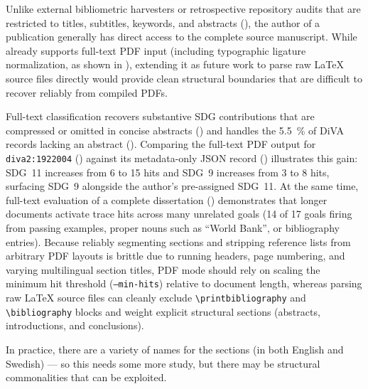 \begin{recommendation}
\label{rec:fullTextAuthorSource}
Unlike external bibliometric harvesters or retrospective repository audits that are restricted to titles, subtitles, keywords, and abstracts (), the author of a publication generally has direct access to the complete source manuscript. While  already supports full-text \gls{PDF} input (including typographic ligature normalization, as shown in ), extending it as future work to parse raw \LaTeX{} source files directly would provide clean structural boundaries that are difficult to recover reliably from compiled \glspl{PDF}.
\medskip

Full-text classification recovers substantive \gls{SDG} contributions that are compressed or omitted in concise abstracts (\eg {}) and handles the \qty{5.5}{\percent} of \gls{DiVA} records lacking an abstract (). Comparing the full-text \gls{PDF} output for \texttt{diva2:1922004} () against its metadata-only \gls{JSON} record () illustrates this gain: \gls{SDG}~11 increases from \num{6} to \num{15} hits and \gls{SDG}~9 increases from \num{3} to \num{8} hits, surfacing \gls{SDG}~9 alongside the author's pre-assigned \gls{SDG}~11. At the same time, full-text evaluation of a complete dissertation () demonstrates that longer documents activate trace hits across many unrelated goals (\eg \num{14} of \num{17} goals firing from passing examples, proper nouns such as \enquote{World Bank}, or bibliography entries). Because reliably segmenting sections and stripping reference lists from arbitrary \gls{PDF} layouts is brittle due to running headers, page numbering, and varying multilingual section titles, \gls{PDF} mode should rely on scaling the minimum hit threshold (\texttt{--min-hits}) relative to document length, whereas parsing raw \LaTeX{} source files can cleanly exclude \texttt{\textbackslash printbibliography} and \texttt{\textbackslash bibliography} blocks and weight explicit structural sections (\eg abstracts, introductions, and conclusions).
\end{recommendation}

In practice, there are a variety of names for the sections (in both English and Swedish) --- so this needs some more study, but there may be structural commonalities that can be exploited.

